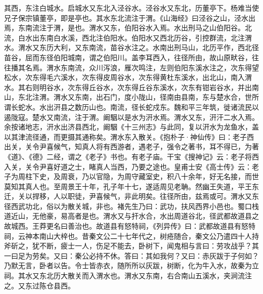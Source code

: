 \documentclass[12pt,UTF8]{ctexbook}
\begin{document}
其西，东注白城水。启城水又东北入泾谷水。泾谷水又东北，历董亭下。杨难当使兄子保宗镇董亭，即是亭也。其水东北流注于渭。《山海经》曰泾谷之山，泾水出焉，东南流注于渭，是也。渭水又东，伯阳谷水入焉。水出刑马之山伯阳谷。北流，白水出东南白水溪，西北注伯阳水。伯阳水又西北历谷，引控群流，北注渭水。渭水又东历大利，又东南流，苗谷水注之。水南出刑马山，北历平作，西北径苗谷，屈而东径伯阳城南，谓之伯阳川。盖李耳西入，往径所由，故山原畎谷，往往播其名焉。渭水东南流，众川泻浪，雁次鸣注，左则伯阳东溪水注之，次东得望松水，次东得毛六溪水，次东得皮周谷水，次东得黄杜东溪水，出北山，南入渭水。其右则明谷水，次东得丘谷水，次东得丘谷东溪水，次东有钳岩谷水，并出南山，东北注渭。渭水又东南，出石门，度小陇山，径南由县南，东与楚水合，世所谓长蛇水。水出汧县之数历山也。南流，径长蛇戍东。魏和平三年筑，徙诸流民以遏陇寇。楚水又南流，注于渭。阚駰以是水为汧水焉。渭水又东，汧汗二水入焉。余按诸地志，汧水出济县西北，阚駰《十三州志》与此同，复以汧水为龙鱼水，盖以其津流径通，而更摄其通称矣。渭水东入散关。《抱朴子·神仙传》曰：老子西出关，关令尹喜候气，知真人将有西游者，遇老子，强令之著书，耳不得已，为著《道》、《德》二经，谓之《老子》书也。有老子庙。干宝《搜神记》云：老子将西入关，关令尹喜好道之士，睹真人当西，乃要之途也。皇甫士安《高士传》云：老子为周柱下史，及周衰，乃以官隐，为周守藏室史，积八十余年，好无名接，而世莫知其真人也。至周景王十年，孔子年十七，遂适周见老聃。然幽王失道，平王东迁，关以捍移，人以职徒，尹喜候气，非此明矣。往径所由，兹焉或可。渭水又东径西武功北，俗以为散关城，非也。褚先生乃曰：武功，扶风西界小邑也。蜀口栈道近山，无他豪，易高者是也。渭水又与扞水合，水出周道谷北，径武都故道县之故城西。王莽更名曰善治也。故道县有怒特祠，《列异传》曰：武都故道县有怒特祠，云神本南山大梓也。昔秦文公二十七年代之，树疮随合，秦文公乃遣四十人持斧斫之，犹不断，疲士一人，伤足不能去，卧树下，闻鬼相与言曰：劳攻战乎？其一曰足为劳矣。又曰：秦公必持不休。答曰：其如我何？又曰：赤灰跋于子何如？乃默无言，卧者以告。令士皆赤衣，随所所以灰跋，树断，化为牛入水，故秦为立祠。其水又东北历大散关而入渭水也。渭水又东南，右合南山五溪水，夹涧流注之。又东过陈仓县西。
\end{document}
